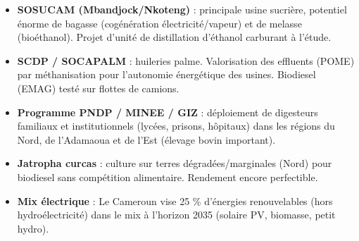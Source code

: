 \documentclass[11pt]{article}
\begin{document}
\begin{savaistu}
\begin{itemize}
\item \textbf{SOSUCAM (Mbandjock/Nkoteng)} : principale usine sucrière, potentiel énorme de bagasse (cogénération électricité/vapeur) et de melasse (bioéthanol). Projet d'unité de distillation d'éthanol carburant à l'étude.
\item \textbf{SCDP / SOCAPALM} : huileries palme. Valorisation des effluents (POME) par méthanisation pour l'autonomie énergétique des usines. Biodiesel (EMAG) testé sur flottes de camions.
\item \textbf{Programme PNDP / MINEE / GIZ} : déploiement de digesteurs familiaux et institutionnels (lycées, prisons, hôpitaux) dans les régions du Nord, de l'Adamaoua et de l'Est (élevage bovin important).
\item \textbf{Jatropha curcas} : culture sur terres dégradées/marginales (Nord) pour biodiesel sans compétition alimentaire. Rendement encore perfectible.
\item \textbf{Mix électrique} : Le Cameroun vise 25 \% d'énergies renouvelables (hors hydroélectricité) dans le mix à l'horizon 2035 (solaire PV, biomasse, petit hydro).
\end{itemize}
\end{savaistu}
\end{document}
